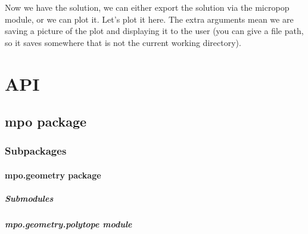 \documentclass[letterpaper,10pt,english]{sphinxmanual}
\begin{document}
\begin{sphinxVerbatim}[commandchars=\\\{\}]
  
\end{sphinxVerbatim}

\sphinxAtStartPar
Now we have the solution, we can either export the solution via the micropop module, or we can plot it. Let’s plot it here. The extra arguments mean we are saving a picture of the plot and displaying it to the user (you can give a file path, so it saves somewhere that is not the current working directory).

\begin{sphinxVerbatim}[commandchars=\\\{\}]
     
\end{sphinxVerbatim}


\chapter{API}
\label{\detokenize{index:api}}

\section{mpo package}
\label{\detokenize{mpo:mpo-package}}\label{\detokenize{mpo::doc}}

\subsection{Subpackages}
\label{\detokenize{mpo:subpackages}}

\subsubsection{mpo.geometry package}
\label{\detokenize{mpo.geometry:mpo-geometry-package}}\label{\detokenize{mpo.geometry::doc}}

\paragraph{Submodules}
\label{\detokenize{mpo.geometry:submodules}}

\paragraph{mpo.geometry.polytope module}
\label{\detokenize{mpo.geometry:mpo-geometry-polytope-module}}
\end{document}
